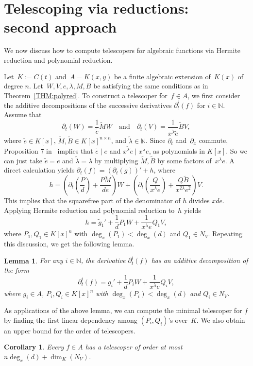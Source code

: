 \documentclass{sig-alternate}
\newtheorem{corollary}[theorem]{Corollary}
\newtheorem{lemma}[theorem]{Lemma}
\newcommand{\bN}{ {\mathbb N}}
\begin{document}
\section{Telescoping via reductions: \\ second approach} \label{SECT:CT-2}

We now discuss how to compute telescopers for algebraic functions via Hermite reduction and
polynomial reduction.

Let~$K := C(t)$ and~$A = K(x, y)$ be a finite algebraic extension of~$K(x)$ of degree $n$.
Let~$W, V, e, \lambda, M, B$ be satisfying the same conditions as in Theorem~\ref{THM:polyred}.
To construct a telescoper for~$f\in A$,
we first consider the additive decompositions of the successive derivatives $\partial_t^i(f)$ for $i\in \bN$.
Assume that
\[\partial_t(W) = \frac{1}{\tilde{e}} \tilde{M}W \quad \text{and}
\quad \partial_t(V) = \frac{1}{x^{\tilde{\lambda}} \tilde{e}} \tilde{B}V,\]
where $\tilde e \in K[x]$, $\tilde M, \tilde B\in K[x]^{n\times n}$, and $\tilde \lambda \in \bN$.
Since $\partial_t$ and~$\partial_x$ commute, Proposition 7 in~\cite{chen14a}
implies that $\tilde e \mid e$ and $x^{\tilde{\lambda}} \tilde{e} \mid x^\lambda e$, as polynomials in $K[x]$.
So we can just take $\tilde e = e$ and $\tilde{\lambda}  = \lambda$ by multiplying $\tilde M, \tilde B$ by some factors
of~$x^\lambda e$. A direct calculation yields $\partial_t(f) = (\partial_t(g))' + h$,
where
\[h = \left(\partial_t(\frac{P}{d})+\frac{P\tilde M}{de}\right)W + \left(\partial_t(\frac{Q}{x^\lambda e})+ \frac{Q\tilde B}{x^{2\lambda} e^2}\right)V.\]
This implies that the squarefree part of the denominator of $h$ divides $xde$. Applying Hermite reduction and polynomial reduction
to~$h$ yields
\[ h = \tilde g_1' + \frac{1}{d} P_1W + \frac{1}{x^\lambda e} Q_1V,\]
where $P_1, Q_1\in K[x]^n$ with $\deg_x(P_1) < \deg_x(d)$ and $Q_1\in N_V$.
Repeating this discussion, we get the following lemma.
\begin{lemma}\label{LEM:idtf}
For any $i\in \bN$, the derivative $\partial_t^i(f)$ has an additive decomposition of the form
\[ \partial_t^i(f) = g_i' + \frac{1}{d} P_iW + \frac{1}{x^\lambda e} Q_iV,\]
where $g_i\in A$, $P_i, Q_i\in K[x]^n$ with $\deg_x(P_i) < \deg_x(d)$ and $Q_i\in N_V$.
\end{lemma}
As applications of the above lemma, we can compute the minimal telescoper for $f$ by finding the first
linear dependency among $(P_i, Q_i)$'s over~$K$. We also obtain an upper bound for the order of telescopers.
\begin{corollary}
Every $f\in A$ has a telescoper of order at most $n\deg_x(d) + \dim_K(N_V)$.
\end{corollary}
\end{document}
